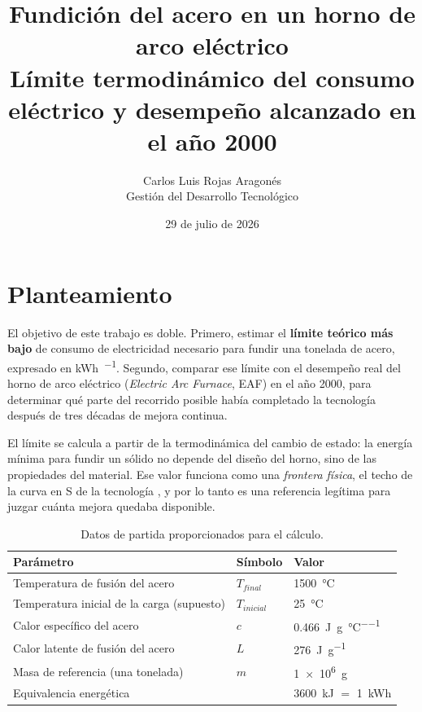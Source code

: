 \documentclass[11pt,letterpaper]{article}
\title{\textbf{Fundición del acero en un horno de arco eléctrico}\\
\large Límite termodinámico del consumo eléctrico y desempeño alcanzado en el
año 2000}
\author{Carlos Luis Rojas Aragonés\\
Gestión del Desarrollo Tecnológico}
\date{29 de julio de 2026}
\begin{document}
\maketitle

\section{Planteamiento}

El objetivo de este trabajo es doble. Primero, estimar el \textbf{límite teórico
más bajo} de consumo de electricidad necesario para fundir una tonelada de acero,
expresado en \si{\kWh\per\ton}. Segundo, comparar ese límite con el desempeño
real del horno de arco eléctrico (\emph{Electric Arc Furnace}, EAF) en el año
2000, para determinar qué parte del recorrido posible había completado la
tecnología después de tres décadas de mejora continua.

El límite se calcula a partir de la termodinámica del cambio de estado: la
energía mínima para fundir un sólido no depende del diseño del horno, sino de
las propiedades del material. Ese valor funciona como una \emph{frontera física},
el techo de la curva en S de la tecnología \parencite{foster1986}, y por lo
tanto es una referencia legítima para juzgar cuánta mejora quedaba disponible.

\begin{table}[ht]
  \centering
  \small
  \caption{Datos de partida proporcionados para el cálculo.}
  \label{tab:datos}
  \begin{tabularx}{\textwidth}{@{}>{\raggedright\arraybackslash}X l l@{}}
    \toprule
    \textbf{Parámetro} & \textbf{Símbolo} & \textbf{Valor} \\
    \midrule
    Temperatura de fusión del acero & $T_{final}$ & \SI{1500}{\celsius} \\
    Temperatura inicial de la carga (supuesto) & $T_{inicial}$ & \SI{25}{\celsius} \\
    Calor específico del acero & $c$ & \SI{0.466}{\joule\per\gram\per\celsius} \\
    Calor latente de fusión del acero & $L$ & \SI{276}{\joule\per\gram} \\
    Masa de referencia (una tonelada) & $m$ & \SI{1e6}{\gram} \\
    Equivalencia energética & & \SI{3600}{\kilo\joule} $=$ \SI{1}{\kWh} \\
    \bottomrule
  \end{tabularx}
\end{table}
\end{document}
